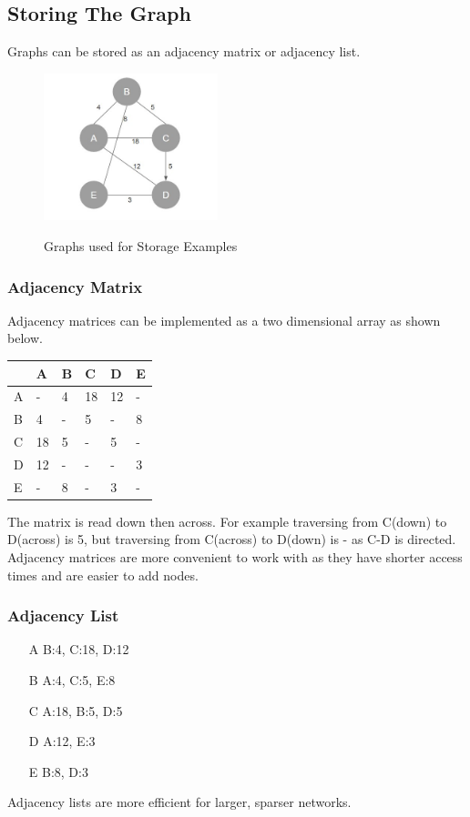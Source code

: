 \documentclass[a4paper,11pt, twocolumn]{article}
\begin{document}
\subsection{Storing The Graph}
Graphs can be stored as an adjacency matrix or adjacency list.
\begin{figure}[H]
    \centering
    \includegraphics[width=0.45\textwidth]{graphsForEx.jpg}
    \label{fig:grapshForEx}
    \caption{Graphs used for Storage Examples}
\end{figure}
\subsubsection{Adjacency Matrix}
Adjacency matrices can be implemented as a two dimensional array as shown below.
\begin{table}[H]
    \centering
    \begin{tabularx}{0.45\textwidth}{X|XXXXX}
        & A & B & C & D & E\\
        \hline
        A & - & 4 & 18 & 12 & - \\
        B & 4 & - & 5 & - & 8 \\
        C & 18 & 5 & - & 5 & - \\
        D & 12 & - & - & - & 3 \\
        E & - & 8 & - & 3 & - \\
    \end{tabularx}
\end{table}
\noindent The matrix is read down then across. For example traversing from C(down) to D(across) is 5, but traversing from C(across) to D(down) is - as C-D is directed. Adjacency matrices are more convenient to work with as they have shorter access times and are easier to add nodes.
\subsubsection{Adjacency List}
\begin{enumerate}
    \item[A] B:4, C:18, D:12
    \item[B] A:4, C:5, E:8
    \item[C] A:18, B:5, D:5
    \item[D] A:12, E:3
    \item[E] B:8, D:3
\end{enumerate}
Adjacency lists are more efficient for larger, sparser networks.
\end{document}
